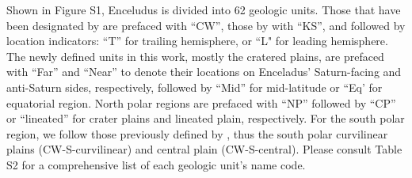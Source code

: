 \documentclass[preprint,12pt,3p,times,authoryear]{elsarticle}
\begin{document}
Shown in Figure S1, Enceludus is divided into 62 geologic units. Those that have been designated by \citet{CrowWillard2015} are prefaced with ``CW'', those by \citet{Kirchoff2009} with ``KS'', and followed by location indicators: ``T'' for trailing hemisphere, or ``L" for leading hemisphere. The newly defined units in this work, mostly the cratered plains, are prefaced with ``Far'' and ``Near'' to denote their locations on Enceladus' Saturn-facing and anti-Saturn sides, respectively, followed by ``Mid'' for mid-latitude or ``Eq’ for equatorial region. North polar regions are prefaced with ``NP'' followed by ``CP'' or ``lineated'' for crater plains and lineated plain, respectively. For the south polar region, we follow those previously defined by \citet{CrowWillard2015}, thus the south polar curvilinear plains (CW-S-curvilinear) and central plain (CW-S-central). Please consult Table S2 for a comprehensive list of each geologic unit’s name code.\\
\end{document}
